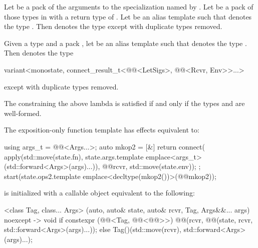 \pnum
Let  be a pack of the arguments
to the  specialization named by
.
Let  be a pack of those types in 
with a return type of .
Let  be an alias template
such that  denotes
the type .
Then  denotes
the type 
except with duplicate types removed.

\pnum
Given a type  and a pack ,
let  be an alias template
such that  denotes
the type .
Then  denotes
the type
\begin{codeblock}
variant<monostate, connect_result_t<@@<LetSigs>, @@<Rcvr, Env>>...>
\end{codeblock}
except with duplicate types removed.

\pnum
The  constraining the above lambda is satisfied
if and only if
the types  and  are well-formed.

\pnum
The exposition-only function template 
has effects equivalent to:
\begin{codeblock}
using args_t = @@<Args...>;
auto mkop2 = [&] {
  return connect(
    apply(std::move(state.fn),
          state.args.template emplace<args_t>(std::forward<Args>(args)...)),
    @@{rcvr, std::move(state.env)});
};
start(state.ops2.template emplace<decltype(mkop2())>(@@{mkop2}));
\end{codeblock}

\pnum
{}
is initialized with a callable object equivalent to the following:
\begin{codeblock}
[]<class Tag, class... Args>
  (auto, auto& state, auto& rcvr, Tag, Args&&... args) noexcept -> void {
    if constexpr (@@<Tag, @@<@@>>) {
      @@(rcvr, @@(state, rcvr, std::forward<Args>(args)...));
    } else {
      Tag()(std::move(rcvr), std::forward<Args>(args)...);
    }
  }
\end{codeblock}

